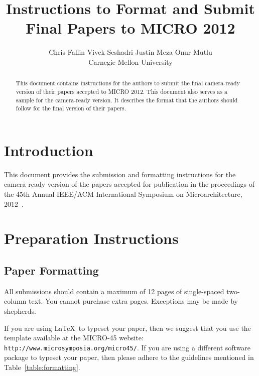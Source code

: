 \documentclass[final]{jpaper_micro_2012}
\begin{document}
\title{Instructions to Format and Submit Final Papers to MICRO 2012}
\author{
  Chris Fallin \quad Vivek Seshadri \quad Justin Meza \quad Onur
  Mutlu\\
  Carnegie Mellon University\\
}
\date{}
\maketitle

\thispagestyle{empty}

\begin{abstract}
  This document contains instructions for the authors to submit
  the final camera-ready version of their papers accepted to MICRO
  2012. This document also serves as a sample for the camera-ready
  version.  It describes the format that the authors should follow
  for the final version of their papers.
\end{abstract}

\section{Introduction}

This document provides the submission and formatting instructions
for the camera-ready version of the papers accepted for
publication in the proceedings of the 45th Annual IEEE/ACM
International Symposium on Microarchitecture, 2012~\cite{micro45}.

\section{Preparation Instructions}

\subsection{Paper Formatting}

All submissions should contain a maximum of 12 pages of
single-spaced two-column text. You cannot purchase extra
pages. Exceptions may be made by shepherds.

If you are using \LaTeX~to typeset your paper, then we suggest
that you use the template available at the MICRO-45 website:
\texttt{http://www.microsymposia.org/micro45/}. If you are using
a different software package to typeset your paper, then please
adhere to the guidelines mentioned in
Table~\ref{table:formatting}.
\end{document}
